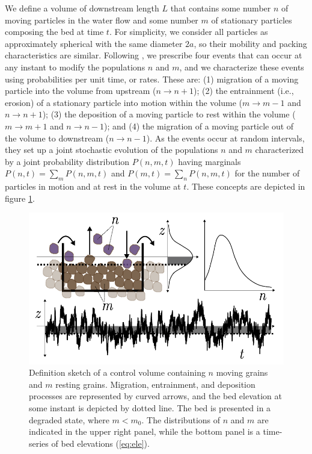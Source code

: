 \documentclass[draft]{agujournal2018}
\begin{document}
We define a volume of downstream length $L$ that contains some number $n$ of moving particles in the water flow and some number $m$ of stationary particles composing the bed at time $t$.
For simplicity, we consider all particles as approximately spherical with the same diameter $2a$, so their mobility and packing characteristics are similar.
Following \citet{Ancey2008}, we prescribe four events that can occur at any instant to modify the populations $n$ and $m$, and we characterize these events using probabilities per unit time, or rates.
These are: (1) migration of a moving particle into the volume from upstream ($n \rightarrow n+1$); (2) the entrainment (i.e., erosion) of a stationary particle into motion within the volume ($m\rightarrow m-1$ and $n\rightarrow n+1$); (3) the deposition of a moving particle to rest within the volume ($m\rightarrow m+1$ and $n\rightarrow n-1$); and (4) the migration of a moving particle out of the volume to downstream ($n\rightarrow n-1$).
As the events occur at random intervals, they set up a joint stochastic evolution of the populations $n$ and $m$ characterized by a joint probability distribution $P(n,m,t)$ having marginals $P(n,t) = \sum_m P(n,m,t)$ and $P(m,t) = \sum_n P(n,m,t)$ for the number of particles in motion and at rest in the volume at $t$.
These concepts are depicted in figure \ref{fig:concept}.
\begin{figure}
  \includegraphics[width=\linewidth,keepaspectratio]{./figures/definition-combo.pdf}
  \vspace{-1.0cm}
  \caption{Definition sketch of a control volume containing $n$ moving grains and $m$ resting grains. Migration, entrainment, and deposition processes are represented by curved arrows, and the bed elevation at some instant is depicted by dotted line. The bed is presented in a degraded state, where $m<m_0$. The distributions of $n$ and $m$ are indicated in the upper right panel, while the bottom panel is a time-series of bed elevations (\ref{eq:ele}).}
  \label{fig:concept}
\vspace{-0.75cm}
\end{figure}
\end{document}
